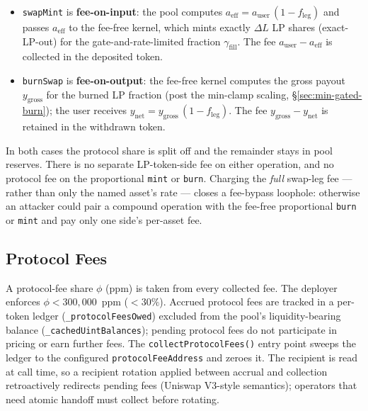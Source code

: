 \documentclass[11pt]{article}
\begin{document}
\begin{itemize}
  \item \texttt{swapMint} is \textbf{fee-on-input}: the pool computes
        $a_{\mathrm{eff}} = a_{\mathrm{user}}\,(1 - f_{\mathrm{leg}})$
        and passes $a_{\mathrm{eff}}$ to the fee-free kernel, which
        mints exactly $\Delta L$ LP shares (exact-LP-out) for the
        gate-and-rate-limited fraction $\gamma_{\mathrm{fill}}$. The
        fee $a_{\mathrm{user}} - a_{\mathrm{eff}}$ is collected in the
        deposited token.
  \item \texttt{burnSwap} is \textbf{fee-on-output}: the fee-free
        kernel computes the gross payout $y_{\mathrm{gross}}$ for the
        burned LP fraction (post the min-clamp scaling,
        \S\ref{sec:min-gated-burn}); the user receives
        $y_{\mathrm{net}} = y_{\mathrm{gross}}\,(1 - f_{\mathrm{leg}})$.
        The fee $y_{\mathrm{gross}} - y_{\mathrm{net}}$ is retained in
        the withdrawn token.
\end{itemize}

In both cases the protocol share is split off and the remainder stays
in pool reserves. There is no separate LP-token-side fee on either
operation, and no protocol fee on the proportional \texttt{mint} or
\texttt{burn}. Charging the \emph{full} swap-leg fee --- rather than
only the named asset's rate --- closes a fee-bypass loophole: otherwise
an attacker could pair a compound operation with the fee-free
proportional \texttt{burn} or \texttt{mint} and pay only one side's
per-asset fee.

\subsection{Protocol Fees}
\label{sec:protocol-fees}

A protocol-fee share $\phi$ (ppm) is taken from every collected fee. The
deployer enforces $\phi < 300{,}000$~ppm ($< 30\%$). Accrued protocol fees
are tracked in a per-token ledger
(\texttt{\_protocol\allowbreak FeesOwed}) excluded from the pool's
liquidity-bearing balance (\texttt{\_cached\allowbreak UintBalances});
pending protocol fees do not participate in pricing or earn further
fees. The \texttt{collectProtocolFees()} entry point sweeps the ledger
to the configured \texttt{protocolFeeAddress} and zeroes it. The
recipient is read at call time, so a recipient rotation applied between
accrual and collection retroactively redirects pending fees (Uniswap
V3-style semantics); operators that need atomic handoff must collect
before rotating.
\end{document}
